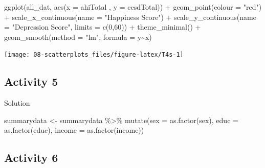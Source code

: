\documentclass[
  oneside]{book}
\newenvironment{Shaded}{\begin{snugshade}}{\end{snugshade}}
\newcommand{\AttributeTok}[1]{\textcolor[rgb]{0.77,0.63,0.00}{#1}}
\newcommand{\DecValTok}[1]{\textcolor[rgb]{0.00,0.00,0.81}{#1}}
\newcommand{\FunctionTok}[1]{\textcolor[rgb]{0.00,0.00,0.00}{#1}}
\newcommand{\NormalTok}[1]{#1}
\newcommand{\OtherTok}[1]{\textcolor[rgb]{0.56,0.35,0.01}{#1}}
\newcommand{\SpecialCharTok}[1]{\textcolor[rgb]{0.00,0.00,0.00}{#1}}
\newcommand{\StringTok}[1]{\textcolor[rgb]{0.31,0.60,0.02}{#1}}
\begin{document}
\begin{Shaded}
\begin{Highlighting}[]
\FunctionTok{ggplot}\NormalTok{(all\_dat, }\FunctionTok{aes}\NormalTok{(}\AttributeTok{x =}\NormalTok{ ahiTotal , }\AttributeTok{y =}\NormalTok{ cesdTotal)) }\SpecialCharTok{+} 
  \FunctionTok{geom\_point}\NormalTok{(}\AttributeTok{colour =} \StringTok{"red"}\NormalTok{) }\SpecialCharTok{+}
  \FunctionTok{scale\_x\_continuous}\NormalTok{(}\AttributeTok{name =} \StringTok{"Happiness Score"}\NormalTok{) }\SpecialCharTok{+}
  \FunctionTok{scale\_y\_continuous}\NormalTok{(}\AttributeTok{name =} \StringTok{"Depression Score"}\NormalTok{,}
                     \AttributeTok{limits =} \FunctionTok{c}\NormalTok{(}\DecValTok{0}\NormalTok{,}\DecValTok{60}\NormalTok{)) }\SpecialCharTok{+}
  \FunctionTok{theme\_minimal}\NormalTok{() }\SpecialCharTok{+}
  \FunctionTok{geom\_smooth}\NormalTok{(}\AttributeTok{method =} \StringTok{"lm"}\NormalTok{, }\AttributeTok{formula =}\NormalTok{ y}\SpecialCharTok{\textasciitilde{}}\NormalTok{x)}
\end{Highlighting}
\end{Shaded}

\begin{center}\texttt{[image: 08-scatterplots\_files/figure-latex/T4s-1]} \end{center}

\hypertarget{activity-5}{%
\subsection{Activity 5}\label{activity-5}}

Solution

\begin{Shaded}
\begin{Highlighting}[]
\NormalTok{summarydata }\OtherTok{\textless{}{-}}\NormalTok{ summarydata }\SpecialCharTok{\%\textgreater{}\%}
  \FunctionTok{mutate}\NormalTok{(}\AttributeTok{sex =} \FunctionTok{as.factor}\NormalTok{(sex),}
         \AttributeTok{educ =} \FunctionTok{as.factor}\NormalTok{(educ),}
         \AttributeTok{income =} \FunctionTok{as.factor}\NormalTok{(income))}
\end{Highlighting}
\end{Shaded}

\hypertarget{activity-6-1}{%
\subsection{Activity 6}\label{activity-6-1}}
\end{document}
